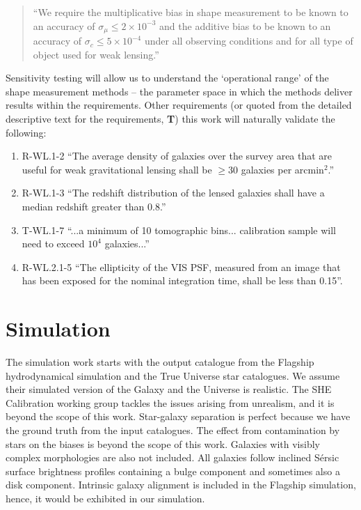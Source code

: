 \documentclass[11pt]{EuclidVIS}
\numberwithin{table}{section}
\numberwithin{figure}{section}
\begin{document}
\begin{quote}
    ``We require the multiplicative bias in shape measurement to be known to an accuracy of $\sigma_\mu \leq 2 \times 10^{-3}$ and the additive bias to be known to an accuracy of $\sigma_c \leq 5 \times 10^{-4}$ under all observing conditions and for all type of object used for weak lensing.''
\end{quote}

Sensitivity testing will allow us to understand the `operational range' of the shape measurement
methods -- the parameter space in which the methods deliver results within the requirements.
Other requirements (or quoted from the detailed descriptive text for the requirements,
\textbf{T}) this work will naturally validate the following:
\begin{enumerate}
    \item R-WL.1-2 ``The average density of galaxies over the survey area that are useful for weak gravitational lensing shall be $\geq30$ galaxies per arcmin$^2$.''
    \item R-WL.1-3 ``The redshift distribution of the lensed galaxies shall have a median redshift greater than 0.8.''
    \item T-WL.1-7 ``...a minimum of 10 tomographic bins... calibration sample will need to exceed $10^4$ galaxies...''
    \item R-WL.2.1-5 ``The ellipticity of the VIS PSF, measured from an image that has been exposed for the nominal integration time, shall be less than 0.15''.
\end{enumerate}

\section{Simulation}
\label{sec:simulation}
The simulation work starts with the output catalogue from the Flagship hydrodynamical simulation
and the True Universe star catalogues. We assume their simulated version of the Galaxy and the
Universe is realistic. The SHE Calibration working group tackles the issues arising from unrealism,
and it is beyond the scope of this work. Star-galaxy separation is perfect because we have the
ground truth from the input catalogues. The effect from contamination by stars on the biases is
beyond the scope of this work. Galaxies with visibly complex morphologies are also not included.
All galaxies follow inclined S{\'e}rsic surface brightness profiles containing a bulge component
and sometimes also a disk component. Intrinsic galaxy alignment is included in the Flagship
simulation, hence, it would be exhibited in our simulation.
\end{document}
